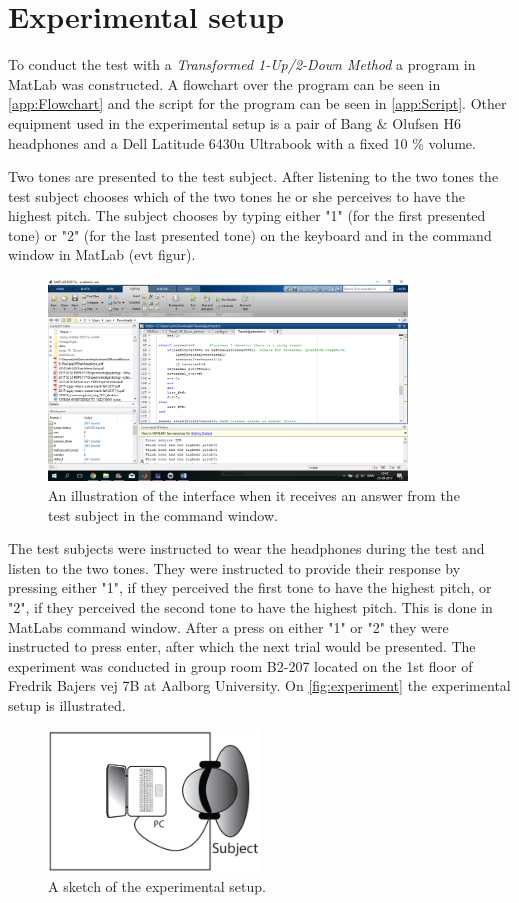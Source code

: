 \section*{Experimental setup}
%
To conduct the test with a \textit{Transformed 1-Up/2-Down Method} a program in MatLab was constructed. A flowchart over the program can be seen in \autoref{app:Flowchart} and the script for the program can be seen in \autoref{app:Script}. Other equipment used in the experimental setup is a pair of Bang $\&$ Olufsen H6 headphones and a Dell Latitude 6430u Ultrabook with a fixed 10 \% volume.

Two tones are presented to the test subject. After listening to the two tones the test subject chooses which of the two tones he or she perceives to have the highest pitch. The subject chooses by typing either "1" (for the first presented tone) or "2" (for the last presented tone) on the keyboard and in the command window in MatLab (evt figur).\blankline
%
\begin{figure}[H]
\centering
\includegraphics[width = 0.85\textwidth]{Figure/Interface.png} 
\caption{An illustration of the interface when it receives an answer from the test subject in the command window.}
\label{fig:TestInterface}
\end{figure}
\noindent
% 
The test subjects were instructed to wear the headphones during the test and listen to the two tones. They were instructed to provide their response by pressing either "1", if they perceived the first tone to have the highest pitch, or "2", if they perceived the second tone to have the highest pitch. This is done in MatLabs command window. After a press on either "1" or "2" they were instructed to press enter, after which the next trial would be presented.\blankline   
%
The experiment was conducted in group room B2-207 located on the 1st floor of Fredrik Bajers vej 7B at Aalborg University. On \autoref{fig:experiment} the experimental setup is illustrated. 
%
\begin{figure}[H]
\centering
\includegraphics[width = 0.5\textwidth]{Figure/experiment.png} 
\caption{A sketch of the experimental setup.}
\label{fig:experiment}
\end{figure}
%

